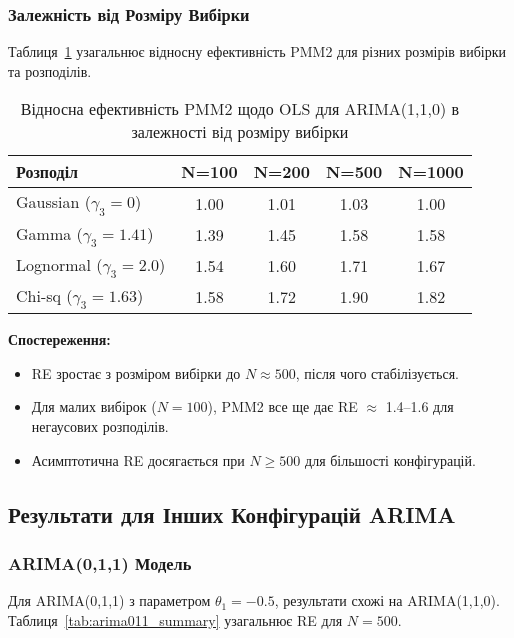 \documentclass[12pt,a4paper]{article}
\begin{document}
	\subsubsection{Залежність від Розміру Вибірки}
	
	Таблиця~\ref{tab:re_vs_sample_size} узагальнює відносну ефективність PMM2 для різних розмірів вибірки та розподілів.
	
	\begin{table}[h]
		\centering
		\caption{Відносна ефективність PMM2 щодо OLS для ARIMA(1,1,0) в залежності від розміру вибірки}
		\label{tab:re_vs_sample_size}
		\begin{tabular}{@{}lcccc@{}}
			\toprule
			\textbf{Розподіл} & \textbf{N=100} & \textbf{N=200} & \textbf{N=500} & \textbf{N=1000} \\
			\midrule
			Gaussian ($\gamma_3=0$)    & 1.00 & 1.01 & 1.03 & 1.00 \\
			Gamma ($\gamma_3=1.41$)    & 1.39 & 1.45 & 1.58 & 1.58 \\
			Lognormal ($\gamma_3=2.0$) & 1.54 & 1.60 & 1.71 & 1.67 \\
			Chi-sq ($\gamma_3=1.63$)   & 1.58 & 1.72 & 1.90 & 1.82 \\
			\bottomrule
		\end{tabular}
	\end{table}
	
	\textbf{Спостереження:}
	\begin{itemize}
		\item RE зростає з розміром вибірки до $N \approx 500$, після чого стабілізується.
		\item Для малих вибірок ($N = 100$), PMM2 все ще дає RE $\approx$ 1.4--1.6 для негаусових розподілів.
		\item Асимптотична RE досягається при $N \geq 500$ для більшості конфігурацій.
	\end{itemize}
	
	\subsection{Результати для Інших Конфігурацій ARIMA}
	\label{subsec:other_configurations}
	
	\subsubsection{ARIMA(0,1,1) Модель}
	
	Для ARIMA(0,1,1) з параметром $\theta_1 = -0.5$, результати схожі на ARIMA(1,1,0). Таблиця~\ref{tab:arima011_summary} узагальнює RE для $N = 500$.
	
\end{document}
